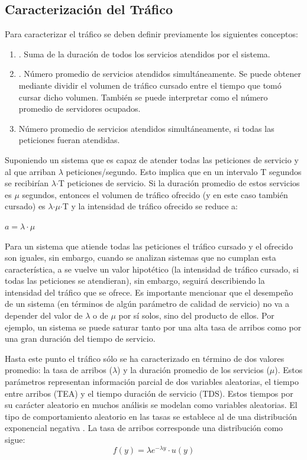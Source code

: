 \subsection{Caracterización del Tráfico}
Para caracterizar el tráfico se deben definir previamente los siguientes conceptos:
\begin{enumerate}
\item  {}. Suma de la duración de todos los servicios atendidos por el sistema.
\item  {}. Número promedio de servicios atendidos simultáneamente. Se puede obtener mediante dividir el volumen de tráfico cursado entre el tiempo que tomó cursar dicho volumen. También se puede interpretar como el número promedio de servidores ocupados.
\item  {} Número promedio de servicios atendidos simultáneamente, si todas las peticiones fueran atendidas.
\end{enumerate}

Suponiendo un sistema que es capaz de atender todas las peticiones de servicio y al que arriban $\lambda$ peticiones/segundo. Esto implica que en un intervalo T segundos se recibirían $\lambda$$\cdot$T peticiones de servicio. Si la duración promedio de estos servicios es $\mu$ segundos, entonces el volumen de tráfico ofrecido (y en este caso también cursado) es $\lambda$$\cdot$$\mu$$\cdot$T y la intensidad de tráfico ofrecido se reduce a:
\begin{center}
$a=\lambda\cdot\mu$
\end{center}

Para un sistema que atiende todas las peticiones el tráfico cursado y el ofrecido son iguales, sin embargo, cuando se analizan sistemas que no cumplan esta característica, a se vuelve un valor hipotético (la intensidad de tráfico cursado, si todas las peticiones se atendieran), sin embargo, seguirá describiendo la intensidad del tráfico que se ofrece. Es importante mencionar que el desempeño de un sistema (en términos de algún parámetro de calidad de servicio) no va a depender del valor de $\lambda$ o de $\mu$ por sí solos, sino del producto de ellos. Por ejemplo, un sistema se puede saturar tanto por una alta tasa de arribos como por una gran duración del tiempo de servicio.\newline

Hasta este punto el tráfico sólo se ha caracterizado en término de dos valores promedio: la tasa de arribos ($\lambda$) y la duración promedio de los servicios ($\mu$). Estos parámetros representan información parcial de dos variables aleatorias, el tiempo entre arribos (TEA) y el tiempo duración de servicio (TDS). Estos tiempos por su carácter aleatorio en muchos análisis se modelan como variables aleatorias. El tipo de comportamiento aleatorio en las tasas se establece al de una distribución exponencial negativa \parencite{Carter1990}. La tasa de arribos corresponde una distribución como sigue:
\begin{equation}
f(y)=\lambda e^{-\lambda y}\cdot u(y)
\label{eqn:lambda}
\end{equation}

